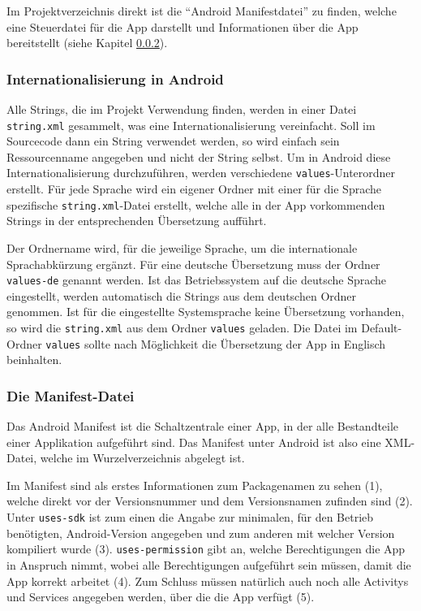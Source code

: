 Im Projektverzeichnis direkt ist die "`Android Manifestdatei"' zu finden, welche eine Steuerdatei f\"ur die App darstellt und Informationen \"uber die App bereitstellt (siehe Kapitel \ref{Die Manifest-Datei}).
\cite{GolemHBRessourcen}

\subsubsection{Internationalisierung in Android} \label{Internationalisierung in Android}
Alle Strings, die im Projekt Verwendung finden, werden in einer Datei \texttt{string.xml} gesammelt, was eine Internationalisierung vereinfacht. Soll im Sourcecode dann ein String verwendet werden, so wird einfach sein Ressourcenname angegeben und nicht der String selbst. Um in Android diese Internationalisierung durchzuf\"uhren, werden verschiedene \texttt{values}-Unterordner erstellt. F\"ur jede Sprache wird ein eigener Ordner mit einer f\"ur die Sprache spezifische \texttt{string.xml}-Datei erstellt, welche alle in der App vorkommenden Strings in der entsprechenden \"Ubersetzung auff\"uhrt. 

Der Ordnername wird, f\"ur die jeweilige Sprache, um die internationale Sprachabk\"urzung erg\"anzt. F\"ur eine deutsche \"Ubersetzung muss der Ordner \texttt{values-de} genannt werden. Ist das Betriebssystem auf die deutsche Sprache eingestellt, werden automatisch die Strings aus dem deutschen Ordner genommen. Ist f\"ur die eingestellte Systemsprache keine \"Ubersetzung vorhanden, so wird die \texttt{string.xml} aus dem Ordner \texttt{values} geladen. Die Datei im Default-Ordner \texttt{values} sollte nach M\"oglichkeit die \"Ubersetzung der App in Englisch beinhalten. \cite{VogelaI18N}
% 

\subsubsection{Die Manifest-Datei} \label{Die Manifest-Datei}
Das Android Manifest ist die Schaltzentrale einer App, in der alle Bestandteile einer Applikation aufgef\"uhrt sind. Das Manifest unter Android ist also eine XML-Datei, welche im Wurzelverzeichnis abgelegt ist. 

Im Manifest sind als erstes Informationen zum Packagenamen zu sehen (1), welche direkt vor der Versionsnummer und dem Versionsnamen zufinden sind (2). Unter \texttt{uses-sdk} ist zum einen die Angabe zur minimalen, f\"ur den Betrieb ben\"otigten, Android-Version angegeben und zum anderen mit welcher Version kompiliert wurde (3). \texttt{uses-permission} gibt an, welche Berechtigungen die App in Anspruch nimmt, wobei alle Berechtigungen aufgef\"uhrt sein m\"ussen, damit die App korrekt arbeitet (4). Zum Schluss m\"ussen nat\"urlich auch noch alle Activitys und Services angegeben werden, \"uber die die App verf\"ugt (5).
\cite{Android44}

